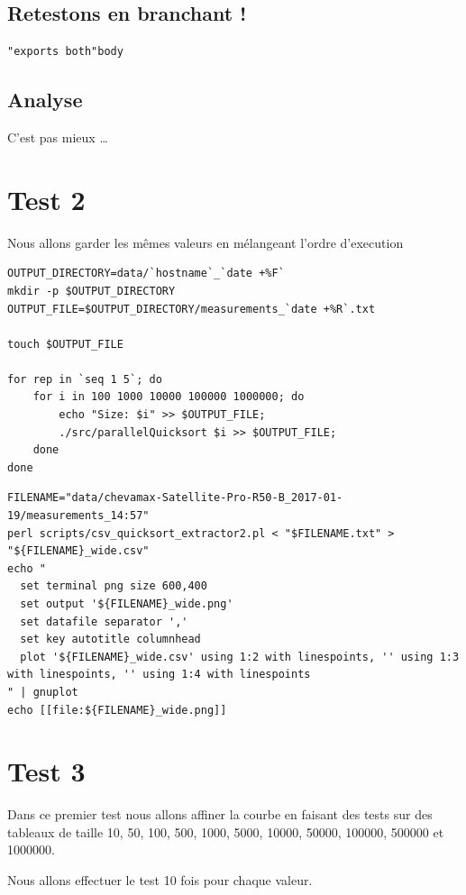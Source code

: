 \documentclass[11pt]{article}
\begin{document}
\subsection{Retestons en branchant !}
\label{sec:orgheadline7}

\begin{verbatim}
"exports both"body
\end{verbatim}

\subsection{Analyse}
\label{sec:orgheadline8}
C'est pas mieux \ldots{}

\section{Test 2}
\label{sec:orgheadline10}
Nous allons garder les mêmes valeurs en mélangeant l'ordre d'execution


\begin{verbatim}
OUTPUT_DIRECTORY=data/`hostname`_`date +%F`
mkdir -p $OUTPUT_DIRECTORY
OUTPUT_FILE=$OUTPUT_DIRECTORY/measurements_`date +%R`.txt

touch $OUTPUT_FILE

for rep in `seq 1 5`; do
	for i in 100 1000 10000 100000 1000000; do
		echo "Size: $i" >> $OUTPUT_FILE;
		./src/parallelQuicksort $i >> $OUTPUT_FILE;
	done
done
\end{verbatim}

\begin{verbatim}
FILENAME="data/chevamax-Satellite-Pro-R50-B_2017-01-19/measurements_14:57"
perl scripts/csv_quicksort_extractor2.pl < "$FILENAME.txt" > "${FILENAME}_wide.csv"
echo "
  set terminal png size 600,400 
  set output '${FILENAME}_wide.png'
  set datafile separator ','
  set key autotitle columnhead
  plot '${FILENAME}_wide.csv' using 1:2 with linespoints, '' using 1:3 with linespoints, '' using 1:4 with linespoints
" | gnuplot
echo [[file:${FILENAME}_wide.png]]
\end{verbatim}

\section{Test 3}
\label{sec:orgheadline11}
Dans ce premier test nous allons affiner la courbe en faisant des tests
sur des tableaux de taille 10, 50, 100, 500, 1000, 5000, 10000, 50000,
100000, 500000 et 1000000.

Nous allons effectuer le test 10 fois pour chaque valeur.
\end{document}
